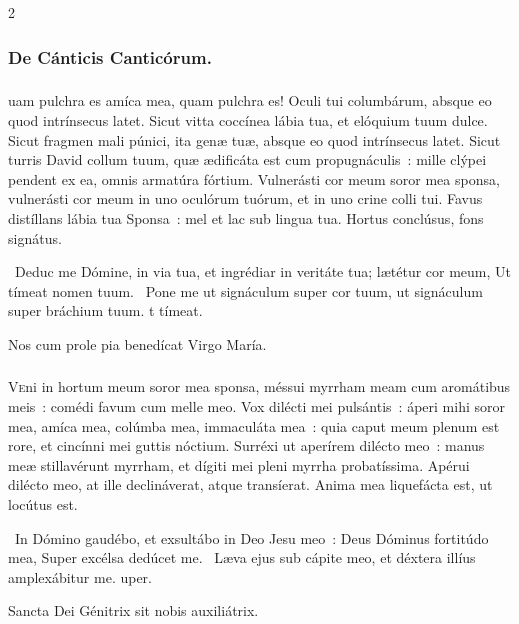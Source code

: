 \documentclass[9pt,twoside]{extarticle}
\begin{document}
\begin{multicols}{2}
{\subsubsection*{\center De Cánticis Canticórum.}
\subsubsection*{\center {}}
uam pulchra es amíca mea, quam pulchra es! Oculi tui columbárum, absque eo quod intrínsecus latet.
Sicut vitta coccínea lábia tua, et elóquium tuum dulce. Sicut fragmen mali púnici, ita genæ tuæ, absque eo quod intrínsecus latet.
Sicut turris David collum tuum, quæ ædificáta est cum propugnáculis~: mille clýpei pendent ex ea, omnis armatúra fórtium.
Vulnerásti cor meum soror mea sponsa, vulnerásti cor meum in uno oculórum tuórum, et in uno crine colli tui.
Favus distíllans lábia tua Sponsa~: mel et lac sub lingua tua.
Hortus conclúsus, fons signátus.

\begin{tightlist}{}
\item {}~Deduc me Dómine, in via tua, et ingrédiar in veritáte tua; lætétur cor meum, \textred{*} Ut tímeat nomen tuum. ~Pone me ut signáculum super cor tuum, ut signáculum super bráchium tuum. t tímeat.
\item {} Nos cum prole pia benedícat Virgo María.
\end{tightlist}

\subsubsection*{\center {}}
\lettrine{V}eni in hortum meum soror mea sponsa, méssui myrrham meam cum aromátibus meis~: comédi favum cum melle meo.
Vox dilécti mei pulsántis~: áperi mihi soror mea, amíca mea, colúmba mea, immaculáta mea~: quia caput meum plenum est rore, et cincínni mei guttis nóctium.
Surréxi ut aperírem dilécto meo~: manus meæ stillavérunt myrrham, et dígiti mei pleni myrrha probatíssima.
Apérui dilécto meo, at ille declináverat, atque transíerat. Anima mea liquefácta est, ut locútus est.

\begin{tightlist}{}
\item {}~In Dómino gaudébo, et exsultábo in Deo Jesu meo~: Deus Dóminus fortitúdo mea, \textred{*} Super excélsa dedúcet me. ~Læva ejus sub cápite meo, et déxtera illíus amplexábitur me. uper.
\item {} Sancta Dei Génitrix sit nobis auxiliátrix.
\end{tightlist}

}
\end{multicols}
\end{document}
